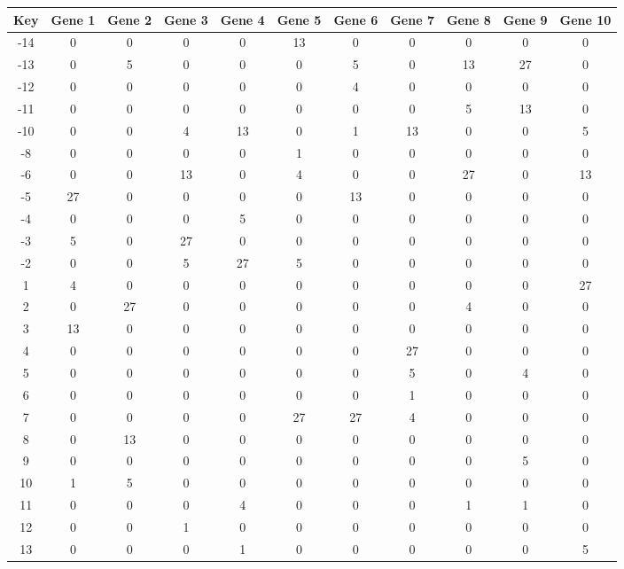 \begin{tabular}{|c|c|c|c|c|c|c|c|c|c|c|}
\hline
Key & Gene 1 & Gene 2 & Gene 3 & Gene 4 & Gene 5 & Gene 6 & Gene 7 & Gene 8 & Gene 9 & Gene 10 \\
\hline
-14 & 0 & 0 & 0 & 0 & 13 & 0 & 0 & 0 & 0 & 0 \\
-13 & 0 & 5 & 0 & 0 & 0 & 5 & 0 & 13 & 27 & 0 \\
-12 & 0 & 0 & 0 & 0 & 0 & 4 & 0 & 0 & 0 & 0 \\
-11 & 0 & 0 & 0 & 0 & 0 & 0 & 0 & 5 & 13 & 0 \\
-10 & 0 & 0 & 4 & 13 & 0 & 1 & 13 & 0 & 0 & 5 \\
-8 & 0 & 0 & 0 & 0 & 1 & 0 & 0 & 0 & 0 & 0 \\
-6 & 0 & 0 & 13 & 0 & 4 & 0 & 0 & 27 & 0 & 13 \\
-5 & 27 & 0 & 0 & 0 & 0 & 13 & 0 & 0 & 0 & 0 \\
-4 & 0 & 0 & 0 & 5 & 0 & 0 & 0 & 0 & 0 & 0 \\
-3 & 5 & 0 & 27 & 0 & 0 & 0 & 0 & 0 & 0 & 0 \\
-2 & 0 & 0 & 5 & 27 & 5 & 0 & 0 & 0 & 0 & 0 \\
1 & 4 & 0 & 0 & 0 & 0 & 0 & 0 & 0 & 0 & 27 \\
2 & 0 & 27 & 0 & 0 & 0 & 0 & 0 & 4 & 0 & 0 \\
3 & 13 & 0 & 0 & 0 & 0 & 0 & 0 & 0 & 0 & 0 \\
4 & 0 & 0 & 0 & 0 & 0 & 0 & 27 & 0 & 0 & 0 \\
5 & 0 & 0 & 0 & 0 & 0 & 0 & 5 & 0 & 4 & 0 \\
6 & 0 & 0 & 0 & 0 & 0 & 0 & 1 & 0 & 0 & 0 \\
7 & 0 & 0 & 0 & 0 & 27 & 27 & 4 & 0 & 0 & 0 \\
8 & 0 & 13 & 0 & 0 & 0 & 0 & 0 & 0 & 0 & 0 \\
9 & 0 & 0 & 0 & 0 & 0 & 0 & 0 & 0 & 5 & 0 \\
10 & 1 & 5 & 0 & 0 & 0 & 0 & 0 & 0 & 0 & 0 \\
11 & 0 & 0 & 0 & 4 & 0 & 0 & 0 & 1 & 1 & 0 \\
12 & 0 & 0 & 1 & 0 & 0 & 0 & 0 & 0 & 0 & 0 \\
13 & 0 & 0 & 0 & 1 & 0 & 0 & 0 & 0 & 0 & 5 \\
\hline
\end{tabular}